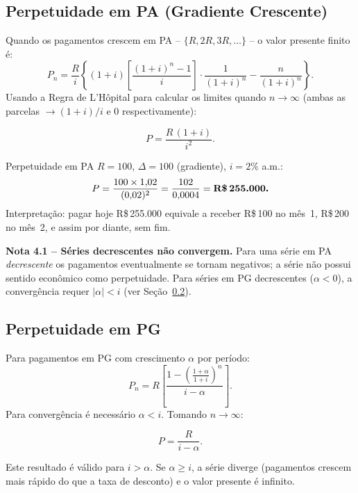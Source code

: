 \subsection{Perpetuidade em PA (Gradiente Crescente)}

Quando os pagamentos crescem em PA -- $\{R, 2R, 3R, \ldots\}$ -- o valor presente finito é:
\[
  P_n = \frac{R}{i}\left\{(1+i)\left[\frac{(1+i)^n-1}{i}\right]\cdot\frac{1}{(1+i)^n}
        - \frac{n}{(1+i)^n}\right\}.
\]
Usando a Regra de L'Hôpital para calcular os limites quando $n\to\infty$
(ambas as parcelas $\to (1+i)/i$ e $0$ respectivamente):

\begin{resultado}
\[
  P = \frac{R\,(1+i)}{i^2}.
\]
\end{resultado}

\begin{exemplo}{Perpetuidade em PA}
$R = 100$, $\Delta = 100$ (gradiente), $i = 2\%$ a.m.:
\[
  P = \frac{100 \times 1{,}02}{(0{,}02)^2} = \frac{102}{0{,}0004}
    = \textbf{R\$\,255.000.}
\]
Interpretação: pagar hoje R\$\,255.000 equivale a receber R\$\,100 no mês~1, R\$\,200 no mês~2, e assim por diante, sem fim.
\end{exemplo}

\begin{nota}
\textbf{Nota 4.1 -- Séries decrescentes não convergem.}
Para uma série em PA \emph{decrescente} os pagamentos eventualmente se tornam negativos;
a série não possui sentido econômico como perpetuidade.
Para séries em PG decrescentes ($\alpha < 0$), a convergência requer $|\alpha| < i$ (ver Seção~\ref{sec:pgperp}).
\end{nota}

\subsection{Perpetuidade em PG}
\label{sec:pgperp}

Para pagamentos em PG com crescimento $\alpha$ por período:
\[
  P_n = R\left[\frac{1-\left(\frac{1+\alpha}{1+i}\right)^n}{i-\alpha}\right].
\]
Para convergência é necessário $\alpha < i$. Tomando $n \to \infty$:

\begin{resultado}
\[
  \boxed{P = \frac{R}{i - \alpha}.}
\]
\end{resultado}

\begin{obs}
Este resultado é válido para $i > \alpha$. Se $\alpha \geq i$, a série diverge
(pagamentos crescem mais rápido do que a taxa de desconto) e o valor presente é infinito.
\end{obs}

